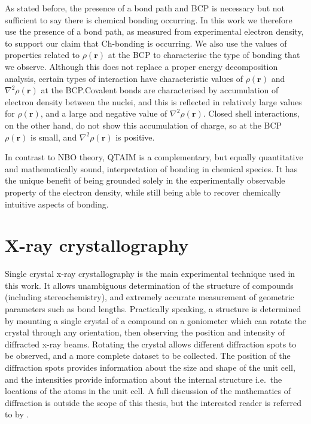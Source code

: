 \begin{refsection}
As stated before, the presence of a bond path and BCP is necessary but not sufficient to say there is chemical bonding occurring.
In this work we therefore use the presence of a bond path, as measured from experimental electron density, to support our claim that Ch-bonding is occurring.
We also use the values of properties related to $ \rho(\textbf{r}) $ at the BCP to characterise the type of bonding that we observe.
Although this does not replace a proper energy decomposition analysis, certain types of interaction have characteristic values of $ \rho(\textbf{r}) $ and $ \nabla^{2}\rho(\textbf{r}) $ at the BCP.\@ Covalent bonds are characterised by accumulation of electron density between the nuclei, and this is reflected in relatively large values for $ \rho(\textbf{r}) $, and a large and negative value of $ \nabla^{2}\rho(\textbf{r}) $.
Closed shell interactions, on the other hand, do not show this accumulation of charge, so at the BCP $ \rho(\textbf{r}) $ is small, and $ \nabla^{2}\rho(\textbf{r}) $ is positive.

In contrast to NBO theory, QTAIM is a complementary, but equally quantitative and mathematically sound, interpretation of bonding in chemical species.
It has the unique benefit of being grounded solely in the experimentally observable property of the electron density, while still being able to recover chemically intuitive aspects of bonding.

\section{X-ray crystallography}
Single crystal x-ray crystallography is the main experimental technique used in this work.
It allows unambiguous determination of the structure of compounds (including stereochemistry), and  extremely accurate measurement of geometric parameters such as bond lengths.
Practically speaking, a structure is determined by mounting a single crystal of a compound on a goniometer which can rotate the crystal through any orientation, then observing the position and intensity of diffracted x-ray beams.
Rotating the crystal allows different diffraction spots to be observed, and a more complete dataset to be collected.
The position of the diffraction spots provides information about the size and shape of the unit cell, and the intensities provide information about the internal structure i.e.\ the locations of the atoms in the unit cell.
A full discussion of the mathematics of diffraction is outside the scope of this thesis, but the interested reader is referred to  by \citeauthor{Stout1989}.\autocite{Stout1989}


\end{refsection}
